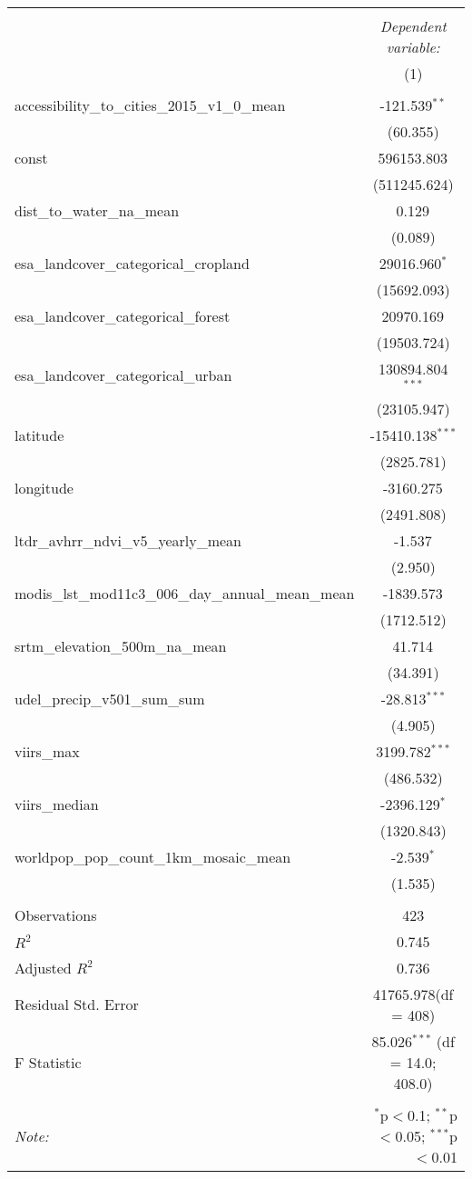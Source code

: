 \begin{table}[!htbp] \centering
\begin{tabular}{@{\extracolsep{5pt}}lc}
\\[-1.8ex]\hline
\hline \\[-1.8ex]
& \multicolumn{1}{c}{\textit{Dependent variable:}} \
\cr \cline{1-2}
\\[-1.8ex] & (1) \\
\hline \\[-1.8ex]
 accessibility_to_cities_2015_v1_0_mean & -121.539$^{**}$ \\
  & (60.355) \\
 const & 596153.803$^{}$ \\
  & (511245.624) \\
 dist_to_water_na_mean & 0.129$^{}$ \\
  & (0.089) \\
 esa_landcover_categorical_cropland & 29016.960$^{*}$ \\
  & (15692.093) \\
 esa_landcover_categorical_forest & 20970.169$^{}$ \\
  & (19503.724) \\
 esa_landcover_categorical_urban & 130894.804$^{***}$ \\
  & (23105.947) \\
 latitude & -15410.138$^{***}$ \\
  & (2825.781) \\
 longitude & -3160.275$^{}$ \\
  & (2491.808) \\
 ltdr_avhrr_ndvi_v5_yearly_mean & -1.537$^{}$ \\
  & (2.950) \\
 modis_lst_mod11c3_006_day_annual_mean_mean & -1839.573$^{}$ \\
  & (1712.512) \\
 srtm_elevation_500m_na_mean & 41.714$^{}$ \\
  & (34.391) \\
 udel_precip_v501_sum_sum & -28.813$^{***}$ \\
  & (4.905) \\
 viirs_max & 3199.782$^{***}$ \\
  & (486.532) \\
 viirs_median & -2396.129$^{*}$ \\
  & (1320.843) \\
 worldpop_pop_count_1km_mosaic_mean & -2.539$^{*}$ \\
  & (1.535) \\
\hline \\[-1.8ex]
 Observations & 423 \\
 $R^2$ & 0.745 \\
 Adjusted $R^2$ & 0.736 \\
 Residual Std. Error & 41765.978(df = 408)  \\
 F Statistic & 85.026$^{***}$ (df = 14.0; 408.0) \\
\hline
\hline \\[-1.8ex]
\textit{Note:} & \multicolumn{1}{r}{$^{*}$p$<$0.1; $^{**}$p$<$0.05; $^{***}$p$<$0.01} \\
\end{tabular}
\end{table}